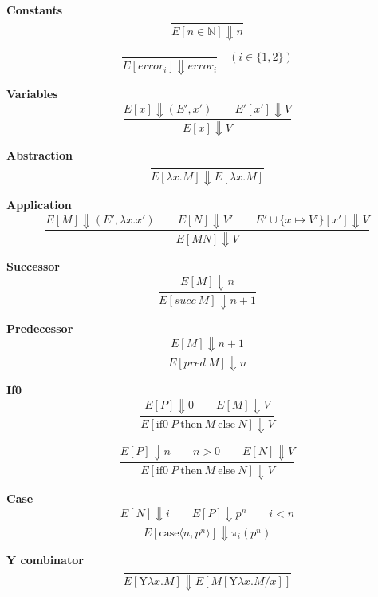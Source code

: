 \documentclass[12pt,a4paper]{report}
\theoremstyle{definition}
\theoremstyle{definition}
\theoremstyle{remark}
\begin{document}
\textbf{Constants}
\begin{equation}
    \frac{}{E[n\in\mathbb{N}] \Downarrow n}
\end{equation}

\begin{equation}
    \frac{}{E[error_i] \Downarrow error_i}\quad(i \in \{1,2\})
\end{equation}

\textbf{Variables}
\begin{equation}
    \frac{E[x] \Downarrow (E', x') \quad\quad E'[x'] \Downarrow V}{E[x] \Downarrow V}
\end{equation}

\textbf{Abstraction}
\begin{equation}
    \frac{}{E[\lambda x. M] \Downarrow E[\lambda x. M]}
\end{equation}

\textbf{Application}
\begin{equation}
    \frac{E[M] \Downarrow (E', \lambda x. x') \quad\quad  E[N] \Downarrow V' \quad\quad E'\cup \{x\mapsto V'\}[x'] \Downarrow V}{E[MN] \Downarrow V}
\end{equation}

\textbf{Successor}
\begin{equation}
    \frac{E[M] \Downarrow n}{E[succ\ M] \Downarrow n + 1}
\end{equation}

\textbf{Predecessor}
\begin{equation}
    \frac{E[M] \Downarrow n + 1}{E[pred\ M] \Downarrow n}
\end{equation}

\textbf{If0}
\begin{equation}
    \frac{E[P] \Downarrow 0 \quad\quad E[M] \Downarrow V}{E[\text{if0}\ P\ \text{then}\ M\ \text{else}\ N] \Downarrow V}
\end{equation}

\begin{equation}
    \frac{E[P] \Downarrow n \quad\quad n > 0 \quad\quad E[N] \Downarrow V}{E[\text{if0}\ P\ \text{then}\ M\ \text{else}\ N] \Downarrow V}
\end{equation}

\textbf{Case}
\begin{equation}
    \frac{E[N] \Downarrow i \quad\quad E[P] \Downarrow p^n \quad\quad i < n}{E[\text{case}\langle n, p^n \rangle] \Downarrow \pi_i(p^n)}
\end{equation}

\textbf{Y combinator}
\begin{equation}
    \frac{}{E[\text{Y} \lambda x. M] \Downarrow E[M[\text{Y} \lambda x. M / x]]}
\end{equation}
\end{document}
